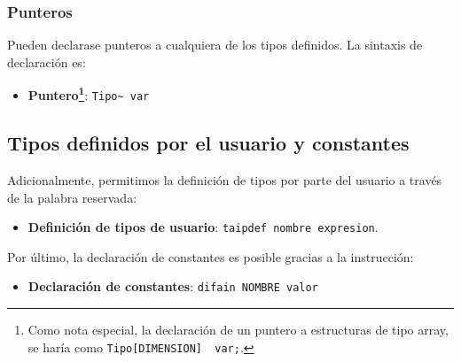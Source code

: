 \documentclass[10pt,a4paper]{article}
\begin{document}
\subsubsection{Punteros}
Pueden declarase punteros a cualquiera de los tipos definidos. La sintaxis de declaración es:
\begin{itemize}
    \item \textbf{Puntero\footnote{Como nota especial, la declaración de un puntero a estructuras de tipo array, se haría como \texttt{Tipo[DIMENSION]~ var;}.}}: \texttt{Tipo\~{} var}
\end{itemize}

\subsection{Tipos definidos por el usuario y constantes}
Adicionalmente, permitimos la definición de tipos por parte del usuario a través de la palabra reservada:
\begin{itemize}
    \item \textbf{Definición de tipos de usuario}: \texttt{taipdef nombre expresion}.
\end{itemize}
Por último, la declaración de constantes es posible gracias a la instrucción:
\begin{itemize}
    \item \textbf{Declaración de constantes}: \texttt{difain NOMBRE valor}
\end{itemize}
\end{document}
